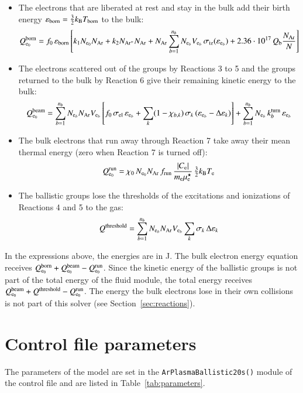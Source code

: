 \documentclass{warpdoc}
\newcommand{\eb}{{\rm e}_b}
\begin{document}
\begin{itemize}
\item The electrons that are liberated at rest and stay in the bulk add their birth energy $\varepsilon_{\rm born}=\tfrac{3}{2}k_{\rm B}T_{\rm born}$ to the bulk:
$$
Q^{\rm born}_{{\rm e}_0}=f_0\,\varepsilon_{\rm born}\left[k_1N_{{\rm e}_0}N_{\rm Ar}+k_2N_{\rm Ar^+}N_{\rm Ar}+N_{\rm Ar}\sum_{b=1}^{n_b}N_{\eb}V_{\eb}\,\sigma_{\rm iz}(\varepsilon_{\eb})+2.36\cdot10^{17}\,Q_{\rm b}\frac{N_{\rm Ar}}{N}\right]
$$
\item The electrons scattered out of the groups by Reactions 3 to 5 and the groups returned to the bulk by Reaction 6 give their remaining kinetic energy to the bulk:
$$
Q^{\rm beam}_{{\rm e}_0}=\sum_{b=1}^{n_b}N_{\eb}N_{\rm Ar}V_{\eb}\left[f_0\,\sigma_{\rm el}\,\varepsilon_{\eb}+\sum_k(1-\chi_{b,k})\,\sigma_k\,(\varepsilon_{\eb}-\Delta\varepsilon_k)\right]
+\sum_{b=1}^{n_b}N_{\eb}\,k^{\rm turn}_b\,\varepsilon_{\eb}
$$
\item The bulk electrons that run away through Reaction 7 take away their mean thermal energy (zero when Reaction 7 is turned off):
$$
Q^{\rm run}_{{\rm e}_0}=\chi_0\,N_{{\rm e}_0}N_{\rm Ar}\,f_{\rm run}\,\frac{|C_{\rm e}|}{m_{\rm e}\mu_{\rm e}^\star}\,\tfrac{3}{2}k_{\rm B}T_{\rm e}
$$
\item The ballistic groups lose the thresholds of the excitations and ionizations of Reactions 4 and 5 to the gas:
$$
Q^{\rm threshold}=\sum_{b=1}^{n_b}N_{\eb}N_{\rm Ar}V_{\eb}\sum_k\sigma_k\,\Delta\varepsilon_k
$$
\end{itemize}
In the expressions above, the energies are in J. The bulk electron energy equation receives $Q^{\rm born}_{{\rm e}_0}+Q^{\rm beam}_{{\rm e}_0}-Q^{\rm run}_{{\rm e}_0}$. Since the kinetic energy of the ballistic groups is not part of the total energy of the fluid module, the total energy receives $Q^{\rm beam}_{{\rm e}_0}+Q^{\rm threshold}-Q^{\rm run}_{{\rm e}_0}$. The energy the bulk electrons lose in their own collisions is not part of this solver (see Section~\ref{sec:reactions}).


\section{Control file parameters}

The parameters of the model are set in the {\tt ArPlasmaBallistic20s()} module of the control file and are listed in Table~\ref{tab:parameters}.
\end{document}
